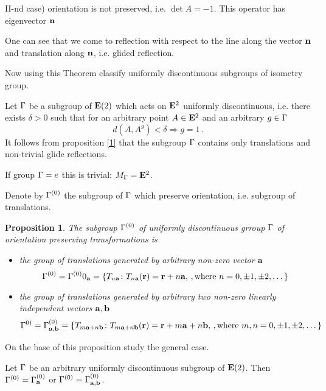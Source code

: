 \documentclass[12pt]{article}
\newtheorem{proposition}{Proposition}
\theoremstyle{definition}
\numberwithin{equation}{section}
\begin{document}
\smallskip

II-nd case) orientation is not preserved, i.e. $\det A=-1$.
  This operator has eigenvector  ${\bf n}$ 

One can see that we come to reflection with respect to the line
along the vector ${\bf n}$ and translation along ${\bf n}$, i.e. glided
reflection.
 


  Now using this Theorem classify 
   uniformly discontinuous subgroups of isometry group.



   Let ${\Gamma}$ be a subgroup of ${\bf E}(2)$ which acts on
${\bf E}^2$ uniformly discontinuous, i.e. there exists
$\delta>0$ such that for an arbitrary point $A\in {\bf E}^2$
and an arbitrary $g\in {\Gamma}$
                  $$
                 d(A,A^g)<\delta 
       \Rightarrow g=1\,.
                   $$
 It follows from proposition \ref{1} that the subgroup ${\Gamma}$
contains only translations and non-trivial 
glide reflections.

  If group ${\Gamma}=e$ this is trivial: $M_{\Gamma}={\bf E}^2$.

Denote by ${\Gamma}^{(0)}$ the subgroup 
of ${\Gamma}$
which preserve orientation, i.e. 
subgroup of translations.


\begin{proposition}\label{3}
The subgroup ${\Gamma}^{(0)}$ of uniformly discontinuous
grroup ${\Gamma}$
of orientation preserving transformations
is 

\begin{itemize}
\item the group of translations generated
  by arbitrary non-zero vector ${\bf a}$
        $$
 {\Gamma}^{(0)}={\Gamma}^{(0)}0_{{\bf a}}=
\{T_{n{\bf a}}\colon T_{n{\bf a}}({\bf r})={\bf r}+n{\bf a},\,,
{\rm where}\,\, n=0,\pm 1,\pm 2,\dots\}
        $$
\item the group of translations generated
  by arbitrary two non-zero linearly independent 
vectors ${\bf a},{\bf b}$
        $$
 {\Gamma}^{0)}={\Gamma}^{(0)}_{{\bf a},{\bf b}}=
\{T_{m{\bf a}+n{\bf b}}\colon T_{m{\bf a}+n{\bf b}}({\bf r})=
{\bf r}+m{\bf a}+n{\bf b},\,,
{\rm where}\,\, m,n=0,\pm 1,\pm 2,\dots\}
        $$
\end{itemize}


\end{proposition}

On the base of this proposition study 
the general case.

\m

Let ${\Gamma}$ be an arbitrary uniformly 
discontinuous subgroup of ${\bf E}(2)$.
Then ${\Gamma}^{(0)}={\Gamma}^{(0)}_{\bf a}$
or ${\Gamma}^{(0)}={\Gamma}^{(0)}_{{\bf a},{\bf b}}$.
\end{document}
